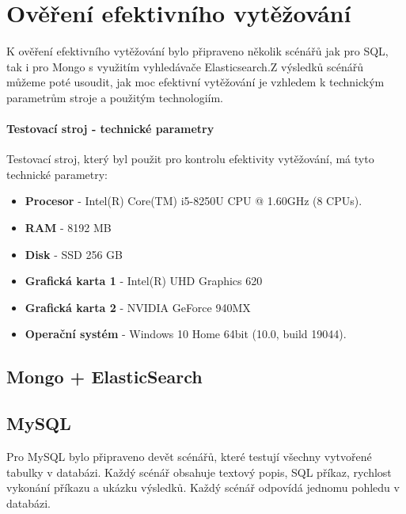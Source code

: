 \lstset{style=sqlstyle}

\chapter{Ověření efektivního vytěžování}
K ověření efektivního vytěžování bylo připraveno několik scénářů jak pro SQL, tak i pro Mongo s využitím vyhledávače Elasticsearch.Z výsledků scénářů můžeme poté usoudit, jak moc efektivní vytěžování je vzhledem k technickým parametrům stroje a použitým technologiím.

\subsubsection{Testovací stroj - technické parametry}
Testovací stroj, který byl použit pro kontrolu efektivity vytěžování, má tyto technické parametry:
\begin{itemize}
\item \textbf{Procesor} - Intel(R) Core(TM) i5-8250U CPU @ 1.60GHz (8 CPUs).
\item \textbf{RAM} - 8192 MB
\item \textbf{Disk} - SSD 256 GB
\item \textbf{Grafická karta 1} - Intel(R) UHD Graphics 620
\item \textbf{Grafická karta 2} - NVIDIA GeForce 940MX
\item \textbf{Operační systém} - Windows 10 Home 64bit (10.0, build 19044).

\end{itemize}

\section{Mongo + ElasticSearch}

\section{MySQL}
Pro MySQL bylo připraveno devět scénářů, které testují všechny vytvořené tabulky v databázi. Každý scénář obsahuje textový popis, SQL příkaz, rychlost vykonání příkazu a ukázku výsledků. Každý scénář odpovídá jednomu pohledu v databázi.

